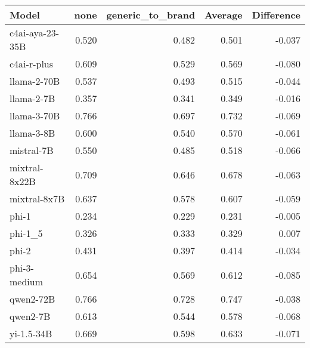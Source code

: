 \begin{tabular}{lrrrr}
\toprule
Model & none & generic_to_brand & Average & Difference \\
\midrule
c4ai-aya-23-35B & 0.520 & 0.482 & 0.501 & -0.037 \\
c4ai-r-plus & 0.609 & 0.529 & 0.569 & -0.080 \\
llama-2-70B & 0.537 & 0.493 & 0.515 & -0.044 \\
llama-2-7B & 0.357 & 0.341 & 0.349 & -0.016 \\
llama-3-70B & 0.766 & 0.697 & 0.732 & -0.069 \\
llama-3-8B & 0.600 & 0.540 & 0.570 & -0.061 \\
mistral-7B & 0.550 & 0.485 & 0.518 & -0.066 \\
mixtral-8x22B & 0.709 & 0.646 & 0.678 & -0.063 \\
mixtral-8x7B & 0.637 & 0.578 & 0.607 & -0.059 \\
phi-1 & 0.234 & 0.229 & 0.231 & -0.005 \\
phi-1_5 & 0.326 & 0.333 & 0.329 & 0.007 \\
phi-2 & 0.431 & 0.397 & 0.414 & -0.034 \\
phi-3-medium & 0.654 & 0.569 & 0.612 & -0.085 \\
qwen2-72B & 0.766 & 0.728 & 0.747 & -0.038 \\
qwen2-7B & 0.613 & 0.544 & 0.578 & -0.068 \\
yi-1.5-34B & 0.669 & 0.598 & 0.633 & -0.071 \\
\bottomrule
\end{tabular}
